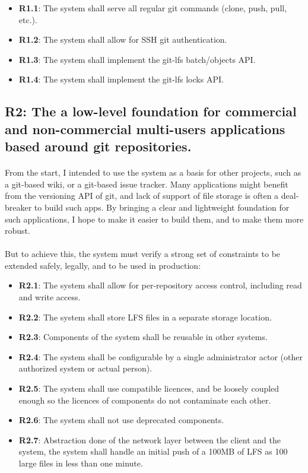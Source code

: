 \begin{itemize}
    \item \textbf{R1.1}: The system shall serve all regular git commands (clone, push, pull, etc.).
    \item \textbf{R1.2}: The system shall allow for SSH git authentication.
    \item \textbf{R1.3}: The system shall implement the git-lfs batch/objects API.
    \item \textbf{R1.4}: The system shall implement the git-lfs locks API.
\end{itemize}

\subsection{R2: The a low-level foundation for commercial and non-commercial multi-users applications based around git repositories.}

\paragraph{}
From the start, I intended to use the system as a basis for other projects, such as a git-based wiki, or a git-based issue tracker. Many applications might benefit from the versioning API of git, and lack of support of file storage is often a deal-breaker to build such apps. By bringing a clear and lightweight foundation for such applications, I hope to make it easier to build them, and to make them more robust.

\paragraph{}
But to achieve this, the system must verify a strong set of constraints to be extended safely, legally, and to be used in production: 

\begin{itemize}
    \item \textbf{R2.1}: The system shall allow for per-repository access control, including read and write access.
    \item \textbf{R2.2}: The system shall store LFS files in a separate storage location.
    \item \textbf{R2.3}: Components of the system shall be reusable in other systems.
    \item \textbf{R2.4}: The system shall be configurable by a single administrator actor (other authorized system or actual person).
    \item \textbf{R2.5}: The system shall use compatible licences, and be loosely coupled enough so the licences of components do not contaminate each other. 
    \item \textbf{R2.6}: The system shall not use deprecated components.
    \item \textbf{R2.7}: Abstraction done of the network layer between the client and the system, the system shall handle an initial push of a 100MB of LFS as 100 large files in less than one minute.
\end{itemize}

